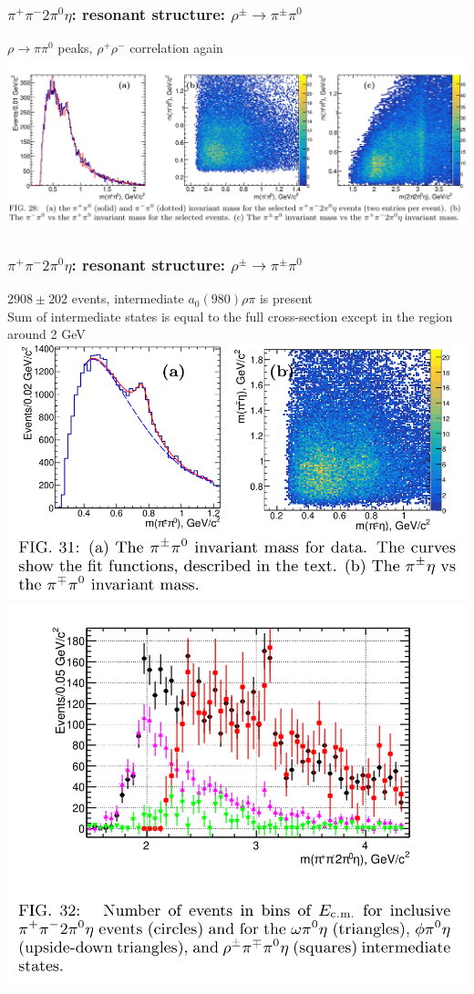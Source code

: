 \documentclass[10pt, aspectratio=169]{beamer}
\def\pip{\pi^+}
\def\pim{\pi^-}
\def\piz{\pi^0}
\def\rhop{\rho^+}
\def\rhom{\rho^-}
\begin{document}
\begin{frame}[label=2pieta-res-rho]%
  \frametitle{$\pip\pim2\piz\eta$: resonant structure: 
  $\rho^\pm\to\pi^\pm\piz$}
  \centering

  $\rho\to\pi\piz$ peaks, $\rhop\rhom$ correlation again \\[1ex]

  \includegraphics[width=\textwidth]{figures/003/fig028}
\end{frame}%

\begin{frame}[label=2pieta-res-rho]%
  \frametitle{$\pip\pim2\piz\eta$: resonant structure: 
  $\rho^\pm\to\pi^\pm\piz$}
  \centering

  $2908 \pm 202$ events, intermediate $a_0(980)\rho\pi$ is present \\
  Sum of intermediate states is equal to the full cross-section except 
  in the region around 2 GeV \\[1ex]

  \includegraphics[width=.55\textwidth]{figures/003/fig031}
  \includegraphics[width=.4\textwidth]{figures/003/fig032}
\end{frame}%
\end{document}
